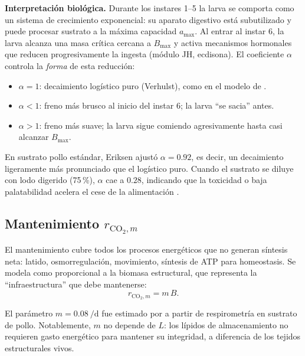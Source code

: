 \textbf{Interpretaci\'{o}n biol\'{o}gica.} Durante los instares 1--5 la larva se comporta como un sistema de crecimiento exponencial: su aparato digestivo est\'{a} subutilizado y puede procesar sustrato a la m\'{a}xima capacidad $a_{\max}$. Al entrar al instar 6, la larva alcanza una masa cr\'{i}tica cercana a $B_{\max}$ y activa mecanismos hormonales que reducen progresivamente la ingesta (m\'{o}dulo JH, ecdisona). El coeficiente $\alpha$ controla la \emph{forma} de esta reducci\'{o}n:
\begin{itemize}
    \item $\alpha = 1$: decaimiento log\'{i}stico puro (Verhulst), como en el modelo de \textcite{eriksenDynamicModellingFeed2022}.
    \item $\alpha < 1$: freno m\'{a}s brusco al inicio del instar 6; la larva ``se sacia'' antes.
    \item $\alpha > 1$: freno m\'{a}s suave; la larva sigue comiendo agresivamente hasta casi alcanzar $B_{\max}$.
\end{itemize}

En sustrato pollo est\'{a}ndar, Eriksen ajust\'o $\alpha = \num{0.92}$, es decir, un decaimiento ligeramente m\'{a}s pronunciado que el log\'{i}stico puro. Cuando el sustrato se diluye con lodo digerido (75\,\si{\percent}), $\alpha$ cae a $\num{0.28}$, indicando que la toxicidad o baja palatabilidad acelera el cese de la alimentaci\'{o}n \parencite{eriksenDynamicModellingFeed2022}.

\subsection{Mantenimiento $r_{\mathrm{CO_2},m}$}

El mantenimiento cubre todos los procesos energ\'{e}ticos que no generan s\'{i}ntesis neta: latido, osmorregulaci\'{o}n, movimiento, s\'{i}ntesis de ATP para homeostasis. Se modela como proporcional a la biomasa estructural, que representa la ``infraestructura'' que debe mantenerse:
\begin{equation}
    r_{\mathrm{CO_2},m} = m\,B.
    \label{eq:rCO2m}
\end{equation}

El par\'{a}metro $m = \SI{0.08}{\per\day}$ fue estimado por \textcite{laganaroGrowthMetabolicPerformance2021a} a partir de respirometr\'{i}a en sustrato de pollo. Notablemente, $m$ no depende de $L$: los l\'{i}pidos de almacenamiento no requieren gasto energ\'{e}tico para mantener su integridad, a diferencia de los tejidos estructurales vivos.

